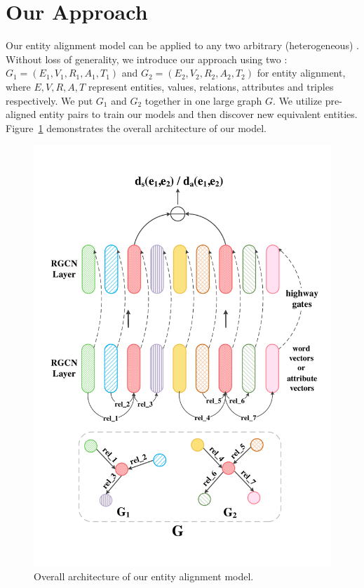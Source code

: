 \section{Our Approach}
	\label{section:app}
	Our entity alignment model can be applied to any two arbitrary (heterogeneous) \KGs. Without loss of generality, we introduce our approach using two \KGs: $G_1 = (E_1,V_1,R_1,A_1,T_1)$ and $G_2 = (E_2,V_2,R_2,A_2,T_2)$ for entity alignment, where
$E,V,R,A,T$ represent entities, values, relations, attributes and triples respectively.
	We put $G_1$ and $G_2$ together in one large graph $G$. We utilize pre-aligned entity pairs to train our models and then discover new
equivalent entities. Figure~\ref{all} demonstrates the overall architecture of our model.
	
	
	\begin{figure}[t!]
		\begin{center}
			\includegraphics[width=0.8\linewidth]{figures/graph2.pdf}
			\caption{Overall architecture of our entity alignment model.}
			\label{all}
		\end{center}
	\end{figure}
	
